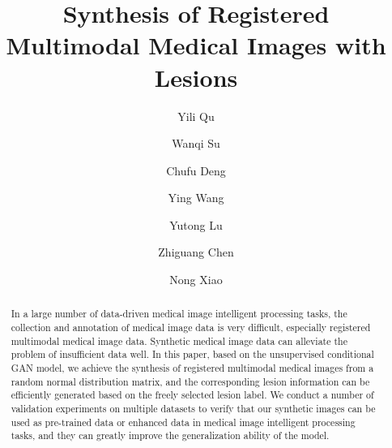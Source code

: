 \documentclass[runningheads]{llncs}
\begin{document}
	\title{Synthesis of Registered Multimodal
		Medical Images with Lesions}
	\author{ Yili Qu \and Wanqi Su \and Chufu Deng \and Ying Wang \\
		\and Yutong Lu \and Zhiguang Chen \and Nong Xiao}
	\maketitle              %
	\begin{abstract}
		In a large number of data-driven medical image intelligent processing tasks, the collection and annotation of medical image data is very difficult, especially registered multimodal medical image data. Synthetic medical image data can alleviate the problem of insufficient data well. In this paper, based on the unsupervised conditional GAN model, we achieve the synthesis of registered multimodal medical images from a random normal distribution matrix, and the corresponding lesion information can be efficiently generated based on the freely selected lesion label. We conduct a number of validation experiments on multiple datasets to verify that our synthetic images can be used as pre-trained data or enhanced data in medical image intelligent processing tasks, and they can greatly improve the generalization ability of the model.
		
	\end{abstract}
\end{document}
